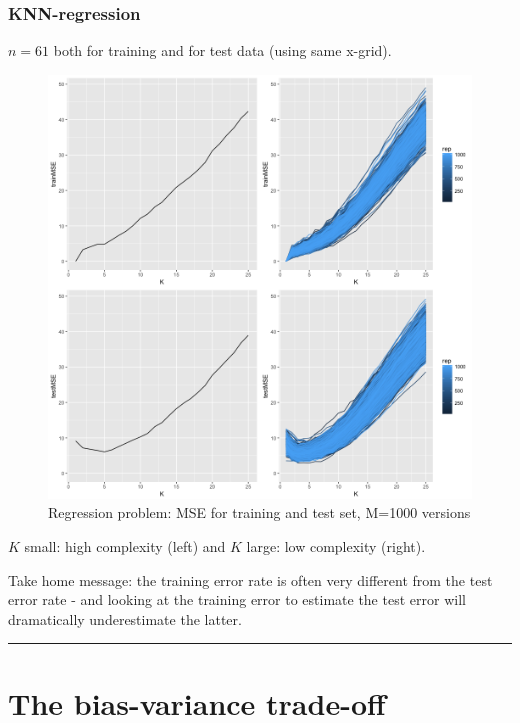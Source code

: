 \documentclass[]{article}
\begin{document}
\hypertarget{knn-regression}{%
\subsubsection{KNN-regression}\label{knn-regression}}

\(n=61\) both for training and for test data (using same x-grid).

\begin{figure}
\centering
\includegraphics{Prob1f3.png}
\caption{Regression problem: MSE for training and test set, M=1000
versions}
\end{figure}

\(K\) small: high complexity (left) and \(K\) large: low complexity
(right).

Take home message: the training error rate is often very different from
the test error rate - and looking at the training error to estimate the
test error will dramatically underestimate the latter.

\begin{center}\rule{0.5\linewidth}{\linethickness}\end{center}

\hypertarget{the-bias-variance-trade-off}{%
\section{The bias-variance
trade-off}\label{the-bias-variance-trade-off}}
\end{document}
